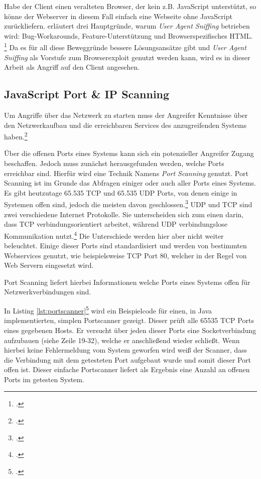 Habe der Client einen veralteten Browser, der kein z.B. JavaScript unterstützt, so könne der Webserver in diesem Fall einfach eine Webseite ohne JavaScript zurückliefern.
\cite{mdnBrowserDetection} erläutert drei Hauptgründe, warum \textit{User Agent Sniffing} betrieben wird: Bug-Workarounds, Feature-Unterstützung und Browserspezifisches HTML.
\footcite[Vgl.][]{mdnBrowserDetection}
Da es für all diese Beweggründe bessere Lösungsansätze gibt und \textit{User Agent Sniffing} als Vorstufe zum Browserexploit genutzt werden kann, wird es in dieser Arbeit als Angriff auf den Client angesehen.


\subsection{JavaScript Port \& IP Scanning}
Um Angriffe über das Netzwerk zu starten muss der Angreifer Kenntnisse über den Netzwerkaufbau und die erreichbaren Services des anzugreifenden Systems haben.\footcite[Vgl.][937]{port1}

Über die offenen Ports eines Systems kann sich ein potenzieller Angreifer Zugang beschaffen. Jedoch muss zunächst herausgefunden werden, welche Ports erreichbar sind. Hierfür wird eine Technik Namens \textit{Port Scanning} genutzt. Port Scanning ist im Grunde das Abfragen einiger oder auch aller Ports eines Systems. Es gibt heutzutage 65.535 TCP und 65.535 UDP Ports, von denen einige in Systemen offen sind, jedoch die meisten davon geschlossen.\footcite[Vgl.][937]{port1} UDP und TCP sind zwei verschiedene Internet Protokolle. Sie unterscheiden sich zum einen darin, dass TCP verbindungsorientiert arbeitet, während UDP verbindungslose Kommunikation nutzt.\footcite[Vgl.][]{tcpudp} Die Unterschiede werden hier aber nicht weiter beleuchtet. Einige dieser Ports sind standardisiert und werden von bestimmten Webservices genutzt, wie beispielsweise TCP Port 80, welcher in der Regel von Web Servern eingesetzt wird.

Port Scanning liefert hierbei Informationen welche Ports eines Systems offen für Netzwerkverbindungen sind.

In Listing \ref{lst:portscanner}\footcite[Vgl.][]{portscanner} wird ein Beispielcode für einen, in Java implementierten, simplen Portscanner gezeigt. Dieser prüft alle 65535 TCP Ports eines gegebenen Hosts. Er versucht über jeden dieser Ports eine Socketverbindung aufzubauen (siehe Zeile 19-32), welche er anschließend wieder schließt. Wenn hierbei keine Fehlermeldung vom System geworfen wird weiß der Scanner, dass die Verbindung mit dem getesteten Port aufgebaut wurde und somit dieser Port offen ist. Dieser einfache Portscanner liefert als Ergebnis eine Anzahl an offenen Ports im getesten System.

